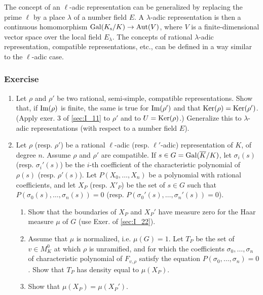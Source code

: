 \begin{obs}
The concept of an $\ell$-adic representation can be generalized by replacing
the prime $\ell$ by a place $\lambda$ of a number field  $E$. A $\lambda$-adic
representation is then a continuous homomorphism $\operatorname{Gal}(K_{\mathrm{s}}/K) \to
\operatorname{Aut}(V)$, where $V$ is a finite-dimensional vector space over the local field
$E_\lambda$. The concepts of rational $\lambda$-adic representation, compatible
representations, etc., can be defined in a way similar to the $\ell$-adic case.
\end{obs}

\subsubsection*{Exercise}
\begin{enumerate}
	\item Let $\rho$ and $\rho'$ be two rational, semi-simple, compatible representations. Show that, if $\operatorname{Im}(\rho)$ is finite, the same is true for $\operatorname{Im}(\rho')$ and that $\operatorname{Ker}(\rho) = \operatorname{Ker}(\rho')$. (Apply exer. 3 of \ref{sec:I_11} to $\rho'$ and to $U = \operatorname{Ker}(\rho)$.) Generalize this to $\lambda$-adic representations (with respect to a number field $E$).
	\item Let $\rho$ (resp. $\rho'$) be a rational $\ell$-adic (resp. $\ell'$-adic) representation of $K$, of degree $n$. Assume $\rho$ and $\rho'$ are compatible. If $s \in G = \operatorname{Gal}(\overline{K}/K)$, let $\sigma_i(s)$ (resp. $\sigma_i'(s)$) be the
\dpage 
	$i$-th coefficient of the characteristic polynomial of $\rho(s)$ (resp. $\rho'(s)$). Let $P(X_0,\hdots,X_n)$ be a polynomial with rational coefficients, and let $X_P$ (resp. $X'_P$) be the set of $s \in G$ such that $P(\sigma_0(s),\hdots,\sigma_n(s)) = 0$ (resp. $P(\sigma_0'(s),\hdots,\sigma_n'(s)) = 0$).
	\begin{enumerate}
		\item Show that the boundaries of $X_P$ and $X_P'$ have measure zero for the Haar measure $\mu$ of $G$ (use Exer. of \ref{sec:I_22}).
		\item Assume that $\mu$ is normalized, i.e. $\mu(G) = 1$. Let $T_P$ be the set of $v \in M_K^0$ at which $\rho$ is unramified, and for which the coefficients $\sigma_0,\hdots,\sigma_n$ of characteristic polynomial of $F_{v,\rho}$ satisfy the equation $P(\sigma_0,\hdots,\sigma_n) = 0$. Show that $T_P$ has density equal to $\mu(X_P)$.
		\item Show that $\mu(X_P) = \mu(X_P')$.
	\end{enumerate}
\end{enumerate}

